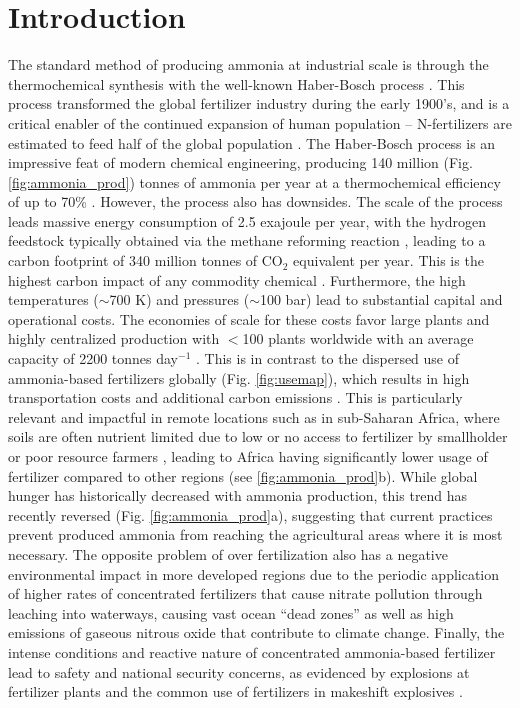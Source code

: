 \section{Introduction}

The standard method of producing ammonia at industrial scale is through the thermochemical synthesis with the well-known Haber-Bosch process \cite{Schloegl_2003}. This process transformed the global fertilizer industry during the early 1900's, and is a critical enabler of the continued expansion of human population \cite{Smil_1999} -- N-fertilizers are estimated to feed half of the global population \cite{Zhang_2015}. The Haber-Bosch process is an impressive feat of modern chemical engineering, producing 140 million (Fig. \ref{fig:ammonia_prod}) tonnes of ammonia per year at a thermochemical efficiency of up to 70\% \cite{Schloegl_2003,Schiffer_2017}. However, the process also has downsides. The scale of the process leads massive energy consumption of 2.5 exajoule per year, with the hydrogen feedstock typically obtained via the methane reforming reaction \cite{Abbas_2010}, leading to a carbon footprint of 340 million tonnes of CO$_2$ equivalent per year. This is the highest carbon impact of any commodity chemical \cite{Schiffer_2017}. Furthermore, the high temperatures ($\sim$700 K) and pressures ($\sim$100 bar) lead to substantial capital and operational costs. The economies of scale for these costs favor large plants and highly centralized production with $<$100 plants worldwide with an average capacity of 2200 tonnes day$^{-1}$ \cite{McArthur_2017, Bartels}. This is in contrast to the dispersed use of ammonia-based fertilizers globally (Fig. \ref{fig:usemap}), which results in high transportation costs and additional carbon emissions \cite{West_2002}. This is particularly relevant and impactful in remote locations such as in sub-Saharan Africa, where soils are often nutrient limited due to low or no access to fertilizer by smallholder or poor resource farmers \cite{Gilbert_2012, Mueller_2012, VanderVelde2014}, leading to Africa having significantly lower usage of fertilizer compared to other regions (see \ref{fig:ammonia_prod}b). While global hunger has historically decreased with ammonia production, this trend has recently reversed (Fig. \ref{fig:ammonia_prod}a), suggesting that current practices prevent produced ammonia from reaching the agricultural areas where it is most necessary. The opposite problem of over fertilization also has a negative environmental impact in more developed regions due to the periodic application of higher rates of concentrated fertilizers that cause nitrate pollution through leaching into waterways, causing vast ocean ``dead zones'' \cite{Diaz2008, Stevens_2019} as well as high emissions of gaseous nitrous oxide that contribute to climate change. Finally, the intense conditions and reactive nature of concentrated ammonia-based fertilizer lead to safety and national security concerns, as evidenced by explosions at fertilizer plants and the common use of fertilizers in makeshift explosives \cite{Marlair_2005}.

